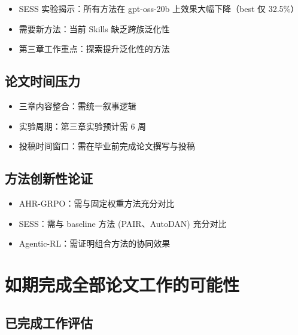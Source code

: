 \documentclass[12pt,a4paper]{article}
\newcommand{\danger}[1]{\textcolor{dangerred}{#1}}
\begin{document}
\begin{itemize}
    \item \danger{SESS 实验揭示}：所有方法在 gpt-oss-20b 上效果大幅下降（best 仅 32.5\%）
    \item 需要新方法：当前 Skills 缺乏跨族泛化性
    \item 第三章工作重点：探索提升泛化性的方法
\end{itemize}

\subsection{论文时间压力}

\begin{itemize}
    \item 三章内容整合：需统一叙事逻辑
    \item 实验周期：第三章实验预计需 6 周
    \item 投稿时间窗口：需在毕业前完成论文撰写与投稿
\end{itemize}

\subsection{方法创新性论证}

\begin{itemize}
    \item AHR-GRPO：需与固定权重方法充分对比
    \item SESS：需与 baseline 方法 (PAIR、AutoDAN) 充分对比
    \item Agentic-RL：需证明组合方法的协同效果
\end{itemize}

\section{如期完成全部论文工作的可能性}

\subsection{已完成工作评估}
\end{document}
